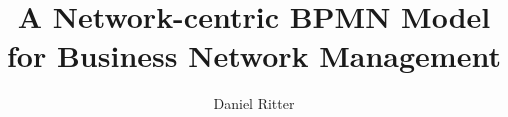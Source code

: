 
  \title{A Network-centric BPMN Model for Business Network Management}

  \author{Daniel Ritter}

  
\maketitle
\clearpage
\setcounter{page}{163}